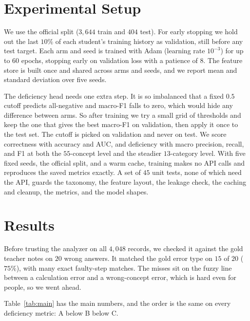\documentclass[11pt]{article}
\begin{document}
\section{Experimental Setup}
We use the official split ($3{,}644$ train and $404$ test). For early stopping we hold
out the last $10\%$ of each student's training history as validation, still before any
test target. Each arm and seed is trained with Adam (learning rate $10^{-3}$) for up to
$60$ epochs, stopping early on validation loss with a patience of $8$. The feature
store is built once and shared across arms and seeds, and we report mean and standard
deviation over five seeds.

The deficiency head needs one extra step. It is so imbalanced that a fixed $0.5$ cutoff
predicts all-negative and macro-F1 falls to zero, which would hide any difference
between arms. So after training we try a small grid of thresholds and keep the one that
gives the best macro-F1 on validation, then apply it once to the test set. The cutoff
is picked on validation and never on test. We score correctness with accuracy and AUC,
and deficiency with macro precision, recall, and F1 at both the $55$-concept level and
the steadier $13$-category level. With five fixed seeds, the official split, and a warm
cache, training makes no API calls and reproduces the saved metrics exactly. A set of
$45$ unit tests, none of which need the API, guards the taxonomy, the feature layout,
the leakage check, the caching and cleanup, the metrics, and the model shapes.

\section{Results}
Before trusting the analyzer on all $4{,}048$ records, we checked it against the gold
teacher notes on $20$ wrong answers. It matched the gold error type on $15$ of $20$
($75\%$), with many exact faulty-step matches. The misses sit on the fuzzy line between
a calculation error and a wrong-concept error, which is hard even for people, so we
went ahead.

Table~\ref{tab:main} has the main numbers, and the order is the same on every
deficiency metric: A below B below C.
\end{document}

